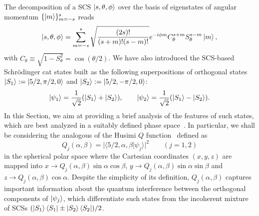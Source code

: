The decomposition of a \ac{SCS} $\ket{s,\theta,\phi}$ over the basis of eigenstates of angular momentum $\{\ket{m}\}_{m=-s}^s$ reads
\begin{equation}
	\ket{s,\theta,\phi} =
	\sum^s_{m=-s}
		\sqrt{\frac{(2s)!}{(s+m)!(s-m)!}}
		e^{-i\phi m} C^{s+m}_\theta S^{s-m}_\theta \ket{m},
\end{equation}
with $C_\theta\equiv\sqrt{1-S^2_\theta}=\cos(\theta/2)$. We have also introduced the \ac{SCS}-based Schrödinger cat states built as the following superpositions of orthogonal states $\ket{S_1}:=\ket{5/2,\pi/2,0}$ and $\ket{S_2}:=\ket{5/2,-\pi/2,0}$:
\begin{equation}
\ket{\psi_{1}}=\frac{1}{\sqrt 2}(\ket{S_1}+\ket{S_2}),\qquad\ket{\psi_{2}}=\frac{1}{\sqrt 2}(\ket{S_1}-\ket{S_2}).
\end{equation}
In this Section, we aim at providing a brief analysis of the features of such states, which are best analyzed in a suitably defined phase space~\cite{agarwal1997atomic}. In particular, we shall be considering the analogous of the Husimi $Q$ function~\cite{walls2007quantum} defined as
\begin{equation}
\label{deco}
Q_j(\alpha,\beta)=\vert\langle{5/2,\alpha,\beta}\vert\psi_j\rangle\vert^2\qquad(j=1,2)
\end{equation}
in the spherical polar space where the Cartesian coordinates $(x,y,z)$ are mapped into $x\to Q_j(\alpha,\beta)\sin\alpha\cos\beta$, $y\to Q_j(\alpha,\beta)\sin\alpha\sin\beta$ and $z\to Q_j(\alpha,\beta)\cos\alpha$. Despite the simplicity of its definition, $Q_j(\alpha,\beta)$ captures important information about the quantum interference between the orthogonal components of $\ket{\psi_{j}}$, which differentiate such states from the incoherent mixture of \acp{SCS} $(\ket{S_1}\bra{S_1}\pm\ket{S_2}\bra{S_2})/2$. 

